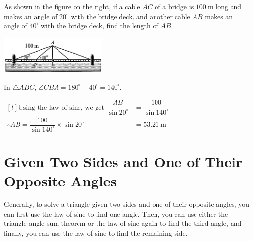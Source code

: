\documentclass{report}
\begin{document}
\begin{question}
   \begin{multicols*}{2}
    As shown in the figure on the right, if a cable $AC$ of a bridge is $100 \mathrm{~m}$ long and makes an angle of $20^\circ$ with the bridge deck, and another cable $AB$ makes an angle of $40^\circ$ with the bridge deck, find the length of $AB$.
    \begin{center}
        \includegraphics[width=0.4\textwidth]{assets/10-5.jpg}
    \end{center}
   \end{multicols*}

    \sol{}

    \noindent In $\triangle ABC$, $\angle CBA = 180^\circ - 40^\circ = 140^\circ$.

    \noindent $\begin{aligned}[t]
        \text{Using the law of sine, we get }\dfrac{AB}{\sin 20^\circ}&=\dfrac{100}{\sin 140^\circ}\\
        \therefore A B=\dfrac{100}{\sin 140^{\circ}} \times \sin 20^{\circ}&=53.21 \mathrm{~m} 
    \end{aligned}$
\end{question}

\newpage
\section*{Given Two Sides and One of Their Opposite Angles}

Generally, to solve a triangle given two sides and one of their opposite angles, you can first use the law of sine to find one angle. Then, you can use either the triangle angle sum theorem or the law of sine again to find the third angle, and finally, you can use the law of sine to find the remaining side.
\end{document}

